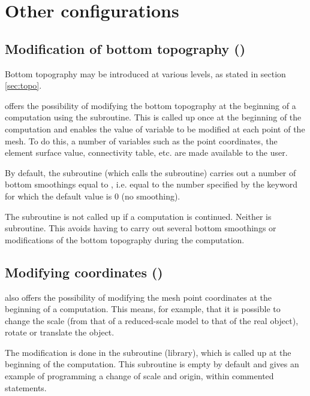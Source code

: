 \chapter{Other configurations}

\section{Modification of bottom topography ()}

Bottom topography may be introduced at various levels, as stated
in section \ref{sec:topo}.

 offers the possibility of modifying the bottom topography at the
beginning of a computation using the  subroutine.
This is called up once at the beginning of the computation and enables the value
of variable  to be modified at each point of the mesh.
To do this, a number of variables such as the point coordinates, the element
surface value, connectivity table, etc. are made available to the user.

By default, the  subroutine (which calls the
 subroutine) carries out a number
of bottom smoothings equal to ,
i.e. equal to the number specified by the keyword
for which the default value is 0 (no smoothing).

The  subroutine is not called up
if a computation is continued.
Neither is  subroutine.
This avoids having to carry out several bottom smoothings or modifications
of the bottom topography during the computation.


\section{Modifying coordinates ()}

 also offers the possibility of modifying the mesh point coordinates
at the beginning of a computation.
This means, for example, that it is possible to change the scale
(from that of a reduced-scale model to that of the real object),
rotate or translate the object.

The modification is done in the  subroutine
(\bief library), which is called up at the beginning of the computation.
This subroutine is empty by default and gives an example of programming
a change of scale and origin, within commented statements.

